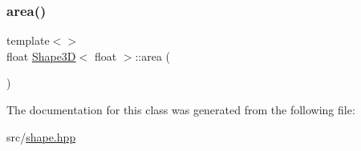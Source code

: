 \mbox{\label{classShape3D_ae3c7c5cca570561caf09868885bea389}} 
\subsubsection{\texorpdfstring{area()}{area()}\hspace{0.1cm}{\footnotesize\ttfamily [2/2]}}
{\footnotesize\ttfamily template$<$$>$ \\
float \mbox{\hyperlink{classShape3D}{Shape3D}}$<$ float $>$\+::area (\begin{DoxyParamCaption}{ }\end{DoxyParamCaption})\hspace{0.3cm}{\ttfamily [inline]}}



The documentation for this class was generated from the following file\+:\begin{DoxyCompactItemize}
\item 
src/\mbox{\hyperlink{shape_8hpp}{shape.\+hpp}}\end{DoxyCompactItemize}
